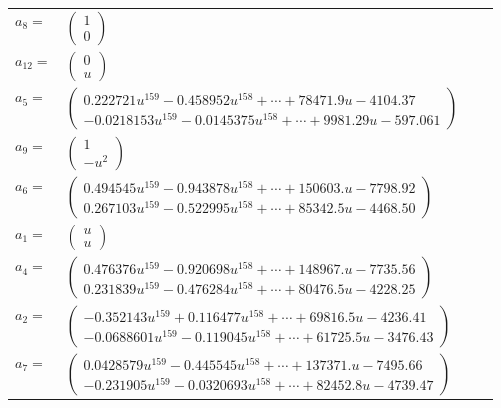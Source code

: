 \documentclass[1p]{elsarticle_modified}
\theoremstyle{definition}
\begin{document}
\begin{tabular}{m{7pt} m{180pt} m{7pt} m{180pt} }
\flushright $a_{8}=$&$\begin{pmatrix}1\\0\end{pmatrix}$ \\
\flushright $a_{12}=$&$\begin{pmatrix}0\\u\end{pmatrix}$ \\
\flushright $a_{5}=$&$\begin{pmatrix}0.222721 u^{159}-0.458952 u^{158}+\cdots+78471.9 u-4104.37\\-0.0218153 u^{159}-0.0145375 u^{158}+\cdots+9981.29 u-597.061\end{pmatrix}$ \\
\flushright $a_{9}=$&$\begin{pmatrix}1\\- u^2\end{pmatrix}$ \\
\flushright $a_{6}=$&$\begin{pmatrix}0.494545 u^{159}-0.943878 u^{158}+\cdots+150603. u-7798.92\\0.267103 u^{159}-0.522995 u^{158}+\cdots+85342.5 u-4468.50\end{pmatrix}$ \\
\flushright $a_{1}=$&$\begin{pmatrix}u\\u\end{pmatrix}$ \\
\flushright $a_{4}=$&$\begin{pmatrix}0.476376 u^{159}-0.920698 u^{158}+\cdots+148967. u-7735.56\\0.231839 u^{159}-0.476284 u^{158}+\cdots+80476.5 u-4228.25\end{pmatrix}$ \\
\flushright $a_{2}=$&$\begin{pmatrix}-0.352143 u^{159}+0.116477 u^{158}+\cdots+69816.5 u-4236.41\\-0.0688601 u^{159}-0.119045 u^{158}+\cdots+61725.5 u-3476.43\end{pmatrix}$ \\
\flushright $a_{7}=$&$\begin{pmatrix}0.0428579 u^{159}-0.445545 u^{158}+\cdots+137371. u-7495.66\\-0.231905 u^{159}-0.0320693 u^{158}+\cdots+82452.8 u-4739.47\end{pmatrix}$ \\

\end{tabular}
\end{document}
